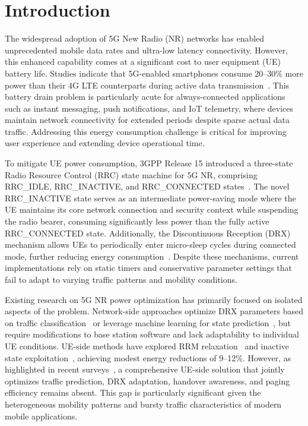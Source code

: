 \documentclass[conference]{IEEEtran}
\begin{document}
\section{Introduction}
\label{sec:introduction}

The widespread adoption of 5G New Radio (NR) networks has enabled unprecedented mobile data rates and ultra-low latency connectivity. However, this enhanced capability comes at a significant cost to user equipment (UE) battery life. Studies indicate that 5G-enabled smartphones consume 20--30\% more power than their 4G LTE counterparts during active data transmission~\cite{3GPPTR38840}. This battery drain problem is particularly acute for always-connected applications such as instant messaging, push notifications, and IoT telemetry, where devices maintain network connectivity for extended periods despite sparse actual data traffic. Addressing this energy consumption challenge is critical for improving user experience and extending device operational time.

To mitigate UE power consumption, 3GPP Release 15 introduced a three-state Radio Resource Control (RRC) state machine for 5G NR, comprising RRC\_IDLE, RRC\_INACTIVE, and RRC\_CONNECTED states~\cite{Hoglund2019, 3GPPTS38331}. The novel RRC\_INACTIVE state serves as an intermediate power-saving mode where the UE maintains its core network connection and security context while suspending the radio bearer, consuming significantly less power than the fully active RRC\_CONNECTED state. Additionally, the Discontinuous Reception (DRX) mechanism allows UEs to periodically enter micro-sleep cycles during connected mode, further reducing energy consumption~\cite{LinSurvey2023}. Despite these mechanisms, current implementations rely on static timers and conservative parameter settings that fail to adapt to varying traffic patterns and mobility conditions.

Existing research on 5G NR power optimization has primarily focused on isolated aspects of the problem. Network-side approaches optimize DRX parameters based on traffic classification~\cite{Quek2021} or leverage machine learning for state prediction~\cite{IslamJSAC2023}, but require modifications to base station software and lack adaptability to individual UE conditions. UE-side methods have explored RRM relaxation~\cite{Raghunath2022} and inactive state exploitation~\cite{Ding2024}, achieving modest energy reductions of 9--12\%. However, as highlighted in recent surveys~\cite{LinSurvey2023}, a comprehensive UE-side solution that jointly optimizes traffic prediction, DRX adaptation, handover awareness, and paging efficiency remains absent. This gap is particularly significant given the heterogeneous mobility patterns and bursty traffic characteristics of modern mobile applications.
\end{document}
